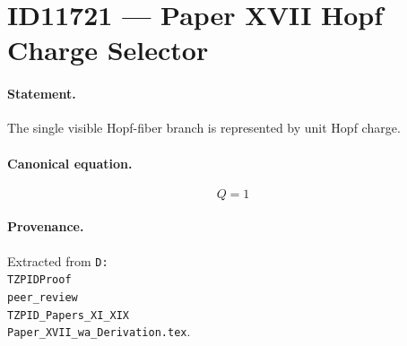 \section*{ID11721 --- Paper XVII Hopf Charge Selector}

\paragraph{Statement.}
The single visible Hopf-fiber branch is represented by unit Hopf charge.

\paragraph{Canonical equation.}
\[
Q=1
\]

\paragraph{Provenance.}
Extracted from \texttt{D:\\TZPIDProof\\peer\_review\\TZPID\_Papers\_XI\_XIX\\Paper\_XVII\_wa\_Derivation.tex}.
